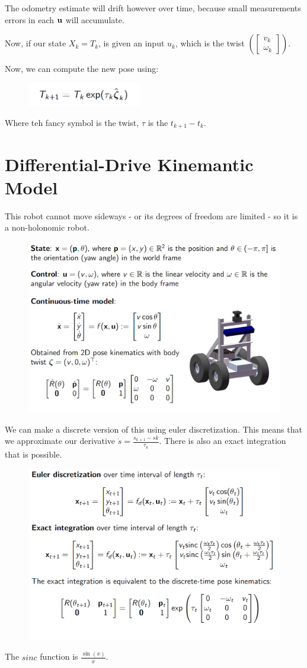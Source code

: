The odometry estimate will drift however over time, because small measurements errors in each $\textbf{u}$ will accumulate.

Now, if our state $X_k = T_k$, is given an input $u_k$, which is the twist $\left(\begin{bmatrix}v_k\\ \omega_k\end{bmatrix}\right)$.

Now, we can compute the new pose using:

\begin{figure}[h]\centering\includegraphics[width=5cm]{img/j_4_8.png}\end{figure}

Where teh fancy symbol is the twist, $\tau$ is the $t_{k+1}-t_k$.

\section{Differential-Drive Kinemantic Model}

This robot cannot move sideways - or its degrees of freedom are limited - so it is a non-holonomic robot. 

\begin{figure}[h]\centering\includegraphics[width=12cm]{img/j_4_9.png}\end{figure}

We can make a discrete version of this using euler discretization. This means that we approximate our derivative $\dot{s} = \frac{s_{k+1}-s{k}}{\tau_k}$. There is also an exact integration that is possible.


\begin{figure}[h]\centering\includegraphics[width=12cm]{img/j_4_10.png}\end{figure}

The $sinc$ function is $\frac{\sin(x)}{x}$.